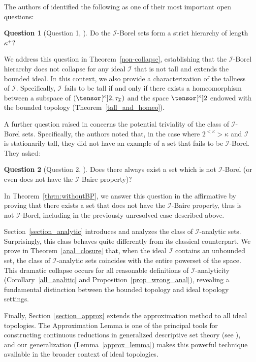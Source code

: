 \documentclass{amsart}
\numberwithin{equation}{section}
\newcommand{\I}{\mathcal{I}}
\newcommand{\pre}[2]{\tensor[^{#1}]{#2}{}}
\newcommand{\1}{\mathbf{I}}
\newcommand{\2}{\mathbf{II}}
\renewcommand{\k}{\kappa}
\theoremstyle{definition}
\newtheorem*{question*}{Question}
\theoremstyle{remark}
\begin{document}
The authors of \cite{HKSW22} identified the following as one of their most important open questions:
\begin{question*}[Question 1, \cite{HKSW22}]
    Do the $\mathcal{I}$-Borel sets form a strict hierarchy of length \(\kappa^+\)?
\end{question*}
We address this question in Theorem~\ref{non-collapse}, establishing that the \(\I\)-Borel hierarchy does not collapse for any ideal \(\I\) that is not tall and extends the bounded ideal.
In this context, we also provide a characterization of the tallness of \(\I\). Specifically, \(\I\) fails to be tall if and only if there exists a homeomorphism between a subspace of \((\pre{\k}{2}, \tau_\I)\) and the space \(\pre{\k}{2}\) endowed with the bounded topology (Theorem~\ref{tall_and_homeo}).


A further question raised in \cite{HKSW22} concerns the potential triviality of the class of \(\I\)-Borel sets. Specifically, the authors noted that, in the case where \(2^{<\k}>\k\) and \(\I\) is stationarily tall, they did not have an example of a set that fails to be \(\I\)-Borel. They asked:
\begin{question*}[Question 2, \cite{HKSW22}]
    Does there always exist a set which is not \(\I\)-Borel (or even does not have the \(\I\)-Baire property)?
\end{question*}
In Theorem~\ref{thrm:withoutBP}, we answer this question in the affirmative by proving that there exists a set that does not have the \(\I\)-Baire property, thus
is not \(\I\)-Borel, including in the previously unresolved case described above.


Section~\ref{section_analytic} introduces and analyzes the class of \(\I\)-analytic sets. Surprisingly, this class behaves quite differently from its classical counterpart. We prove in Theorem~\ref{anal_closure} that, when the ideal \(\I\) contains an unbounded set, the class of \(\I\)-analytic sets coincides with the entire powerset of the space. This dramatic collapse occurs for all reasonable definitions of \(\I\)-analyticity (Corollary~\ref{all_analitic} and Proposition~\ref{prop_wrong_anal}), revealing a fundamental distinction between the bounded topology and ideal topology settings.

Finally, Section~\ref{section_approx} extends the approximation method to all ideal topologies. The Approximation Lemma is one of the principal tools for constructing continuous reductions in generalized descriptive set theory (see \cite{FHK14, HM, FMR21}), and our generalization (Lemma~\ref{approx_lemma}) makes this powerful technique available in the broader context of ideal topologies.
\end{document}
